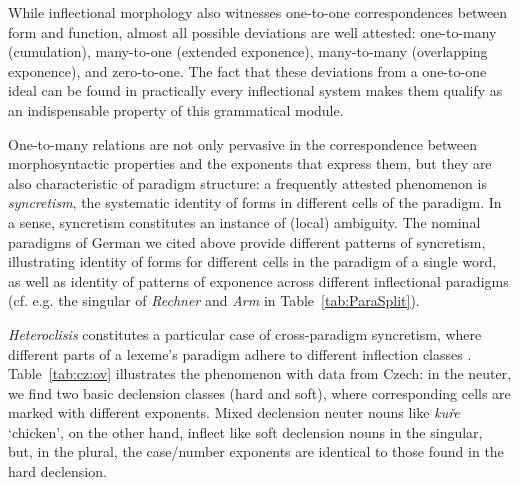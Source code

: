 \documentclass[output=paper]{langscibook}
\begin{document}
While inflectional morphology also witnesses one-to-one
correspondences between form and function, almost all possible
deviations are well attested: one-to-many (cumulation), many-to-one
(extended exponence), many-to-many (overlapping exponence), and
zero-to-one. The fact that these deviations from a one-to-one ideal can
be found in practically every inflectional system makes them qualify
as an indispensable property of this grammatical module.  

\medskip One-to-many relations are not only pervasive in the
correspondence between morphosyntactic properties and the exponents
that express them, but they are also characteristic of paradigm
structure: a frequently attested phenomenon is \emph{syncretism}, the
systematic identity of forms in different cells of the paradigm. In a
sense, syncretism constitutes an instance of (local) ambiguity. The
nominal paradigms of German we cited above provide different patterns
of syncretism, illustrating identity of forms for different
cells in the paradigm of a single word, as well as identity of
patterns of exponence across different inflectional paradigms
(cf. e.g. the singular of \textit{Rechner} and \textit{Arm} in
Table~\ref{tab:ParaSplit}).

\begin{sloppypar}
  \emph{Heteroclisis} constitutes a particular case of cross-paradigm
  syncretism, where different parts of a lexeme's paradigm adhere to
  different inflection classes
  \citep{Stump2006}. Table~\ref{tab:cz:ov} illustrates the phenomenon
  with data from Czech: in the neuter, we find two basic declension
  classes (hard and soft), where corresponding cells are marked with
  different exponents. Mixed declension neuter nouns like
  \textit{kuře} `chicken', on the other hand, inflect like soft
  declension nouns in the singular, but, in the plural, the
  case/number exponents are identical to those found in the hard
  declension.
\end{sloppypar}
\end{document}
